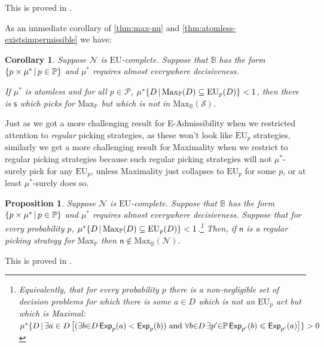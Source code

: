 \documentclass[a4paper,final]{article}
\newtheorem{proposition}[theorem]{Proposition}
\newtheorem{corollary}[theorem]{Corollary}
\renewcommand\P{\mathbb{P}} %
\newcommand\Prob{\mathcal{P}} %
\newcommand\Exp{\mathsf{Exp}}
\newcommand\EU{\mathrm{EU}}
\newcommand\Maximality{\mathrm{Max}}
\renewcommand\S{\mathcal{S}}
\newcommand\s{\mathsf{s}}
\newcommand{\n}{\mathsf{n}}
\newcommand\Nu{\mathcal{N}}
\newcommand{\IB}{\mathbb{B}}
\newcommand{\IP}{\P}
\renewcommand{\color}[1]{}
\newenvironment{colored}[1]{\leavevmode\color{#1}}{}
\newcommand\SetDelimiter[1][]{
	\nonscript\,#1\vert \allowbreak \nonscript\,\mathopen{}}
\providecommand\given{\SetDelimiter}
\renewcommand{\leq}{\leqslant}
\newenvironment{CCM rewritten}
{\begingroup\color{blue}} %
{\endgroup}              %
\begin{document}
\begin{colored}{blue}
This is proved in .


As an immediate corollary of \cref{thm:max-nu} and \cref{thm:atomless-existsimpermissible} we have:

\begin{corollary}\label{thm:atomless-max-existsimpermissible}
	Suppose $\Nu$ is $\EU$-complete. Suppose that 
	$\IB$ has the form $\{p\times \mu^*\given p\in \IP\}$ and $\mu^*$ requires almost everywhere decisiveness.

	If $\mu^*$ is atomless and for all $p\in\Prob$, $\mu^*\{D\given \Maximality_\IP(D)\subseteq\EU_p(D)\}<1$, then there is $\s$ which picks for $\Maximality_\IP$ but which is not in $\Maximality_\IB(\S)$. 
	\end{corollary}




\end{colored}


Just as we got a more challenging result for E-Admissibility when we restricted attention to \emph{regular} picking strategies, as these won't look like $\EU_p$ strategies, similarly we get a more challenging result for Maximality when we restrict to regular picking strategies because such regular picking strategies will not $\mu^*$-surely pick for any $\EU_p$, unless Maximality just collapses to $\EU_p$ for some $p$, or at least $\mu^*$-surely does so.


\begin{proposition}\label{thm:max-nu-reg-nec}
	Suppose $\Nu$ is $\EU$-complete. 
	Suppose that $\IB$ has the form $\{p\times \mu^*\given p\in \IP\}$ and $\mu^*$ requires almost everywhere decisiveness. Suppose that for every probability $p$, $\mu^*\{D\given \Maximality_\IP(D)\subseteq\EU_p(D)\}< 1$.\footnote{Equivalently, that for every probability $p$ there is a non-negligible set of decision problems for which there is some $a\in D$ which is not an $\EU_p$ act but which is Maximal: $\mu^*\{D\given \exists a\in D\left[(\exists b{\in} D \, \Exp_{p}(a)<\Exp_{p}(b))\text{ and }\forall b{\in} D\, \exists p'{\in}\IP \,\Exp_{p'}(b)\leq \Exp_{p'}(a)\right]\}>0$} %
Then, if $\n$ is a regular picking strategy for $\Maximality_\IP$ then $\n\notin \Maximality_\IB(\Nu)$.
\end{proposition}
This is proved in .
\end{document}
